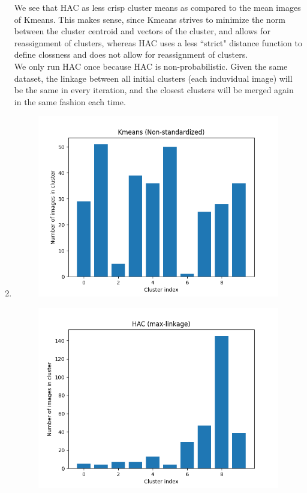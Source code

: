 \documentclass[submit]{harvardml}
\begin{document}
\begin{enumerate}
\begin{figure}[h!]
        \end{figure}
    We see that HAC as less crisp cluster means as compared to the mean images of Kmeans. This makes sense, since Kmeans strives to minimize the norm between the cluster centroid and vectors of the cluster, and allows for reassignment of clusters, whereas HAC uses a less ``strict" distance function to define clossness and does not allow for reassignment of clusters. \\
    We only run HAC once because HAC is non-probabilistic. Given the same dataset, the linkage between all initial clusters (each induvidual image) will be the same in every iteration, and the closest clusters will be merged again in the same fashion each time. 
    
    \newpage
    \item 
    \begin{figure}[h!]
            \centering
            \includegraphics[height=0.4\textheight]{HW4/P5_kmeans.png}
        \end{figure}
    \begin{figure}[h!]
            \centering
            \includegraphics[height=0.4\textheight]{HW4/P5_hac_max.png}

\end{figure}
\end{enumerate}
\end{document}
